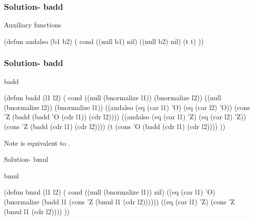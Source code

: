\documentclass[fleqn]{beamer}
\begin{document}
\begin{frame}[fragile]
\frametitle{Solution- badd}
\begin{block}{Auxiliary functions}
  \begin{LISP}
(defun andalso (b1 b2) (
  cond
    ((null b1) nil)
    ((null b2) nil)
    (t t)
))
    \end{LISP}
\end{block}
\end{frame}

\begin{frame}[fragile]
\frametitle{Solution- badd}
\begin{block}{badd}
  \begin{LISP}
(defun badd (l1 l2) (
  cond
    ((null (bnormalize l1)) (bnormalize l2))
    ((null (bnormalize l2)) (bnormalize l1))
    ((andalso (eq (car l1) 'O) (eq (car l2) 'O))
      (cons 'Z (badd (badd 'O (cdr l1)) (cdr l2))))
    ((andalso (eq (car l1) 'Z) (eq (car l2) 'Z))
      (cons 'Z (badd (cdr l1) (cdr l2))))
    (t (cons 'O (badd (cdr l1) (cdr l2))))
))
    \end{LISP}
\end{block}

\begin{block}{Note}
   is equivalent to .
\end{block}
\end{frame}


\begin{frame}[fragile]{Solution- bmul}
\begin{block}{bmul}
  \begin{LISP}
(defun bmul (l1 l2) (
  cond
    ((null (bnormalize l1)) nil)
    ((eq (car l1) 'O)
      (bnormalize
        (badd l1 (cons 'Z (bmul l1 (cdr l2))))))
    ((eq (car l1) 'Z) (cons 'Z (bmul l1 (cdr l2))))
))
    \end{LISP}
\end{block}
\end{frame}
\end{document}
